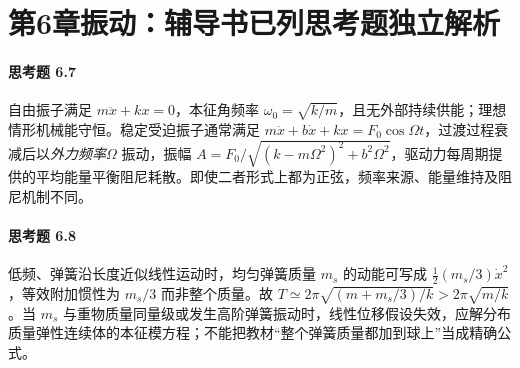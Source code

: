 \section*{第6章\quad 振动：辅导书已列思考题独立解析}
\paragraph{思考题 6.7}
自由振子满足 \(m\ddot x+kx=0\)，本征角频率 \(\omega_0=\sqrt{k/m}\)，且无外部持续供能；理想情形机械能守恒。稳定受迫振子通常满足 \(m\ddot x+b\dot x+kx=F_0\cos\Omega t\)，过渡过程衰减后以\emph{外力频率}\(\Omega\) 振动，振幅 \(A=F_0/\sqrt{(k-m\Omega^2)^2+b^2\Omega^2}\)，驱动力每周期提供的平均能量平衡阻尼耗散。即使二者形式上都为正弦，频率来源、能量维持及阻尼机制不同。

\paragraph{思考题 6.8}
低频、弹簧沿长度近似线性运动时，均匀弹簧质量 \(m_s\) 的动能可写成 \(\frac12(m_s/3)\dot x^2\)，等效附加惯性为 \(m_s/3\) 而非整个质量。故 \(\boxed{T\simeq2\pi\sqrt{(m+m_s/3)/k}}>2\pi\sqrt{m/k}\)。当 \(m_s\) 与重物质量同量级或发生高阶弹簧振动时，线性位移假设失效，应解分布质量弹性连续体的本征模方程；不能把教材“整个弹簧质量都加到球上”当成精确公式。

